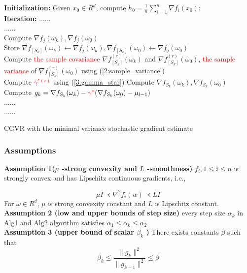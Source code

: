 \documentclass{beamer}
\begin{document}
\begin{frame}
	\begin{algorithm}[H]
		\DontPrintSemicolon
		\textbf{Initialization:} Given $x_0 \in R^d$, compute $h_0 = \frac{1}{n} \sum_{i=1}^{n} \nabla f_i(x_0)$:\\
		\textbf{Iteration:}		
		{
			......\\
			{
				......\\
				{
					Compute $\nabla f_{j}(\omega_k),\nabla f_{j}(\omega_0)$\\
					Store $\nabla f_{[S_k]}(\omega_k)\leftarrow \nabla f_{j}(\omega_k),\nabla f_{[S_k]}(\omega_{0})\leftarrow \nabla f_{j}(\omega_0)$\\
				}
				{
					Compute \textcolor{red}{the sample covariance} $\nabla f_{[S_k]}^{(r)}(\omega_k)$ and $\nabla f_{[S_k]}^{(r)}(\omega_0)$,\textcolor{red}{ the sample variance} of $\nabla f_{[S_k]}^{(r)}(\omega_0)$ using  (\ref{2:sample_variance})\\
					Compute \textcolor{red}{$\gamma^{*(r)}$} using (\ref{3:gamma_star})
				}
				Compute $\nabla f_{S_k}(\omega_k),\nabla f_{S_k}(\omega_0)$ \\			
				Compute $g_k =\nabla f_{S_k}(\omega_k)-\textcolor{red}{\gamma^*} (\nabla f_{S_k}(\omega_0)- \mu_{l-1})$\\
				......\\		
			}
			......
		}
		\caption{CGVR with the minimal variance stochastic gradient estimate}
	\end{algorithm}
\end{frame}

\begin{frame}
		\frametitle{\bf Assumptions} 
	\textbf{Assumption 1($\mu$ -strong convexity and $L$  -smoothness)}  $f_i,1 \leq i \leq n$ is strongly convex and has Lipschitz continuous gradients, i.e.,
	
	\begin{equation}
		\mu I \prec \nabla^2 f_i(w)\prec LI 
		\label{4:assumptinon_1}
	\end{equation}
	For $\omega \in R^d$, $\mu$ is strong convexity constant and $L$ is Lipschitz constant.\\
	\textbf{Assumption 2 (low and upper bounds of step size)} every step size $\alpha_k$  in Alg1 and Alg2 algorithm satisfies  $\alpha_1 \leq \alpha_k \leq \alpha_2$\\
	\textbf{Assumption 3 (upper bound of scalar $\beta_k$ )} There exists constants $\beta$  such that 
	\begin{equation}
		\beta_k \leq \frac{\|g_k\|^2}{\|g_{k-1}\|^2} \leq \beta
		\label{4:assumption_3}
	\end{equation} 
\end{frame}
\end{document}
